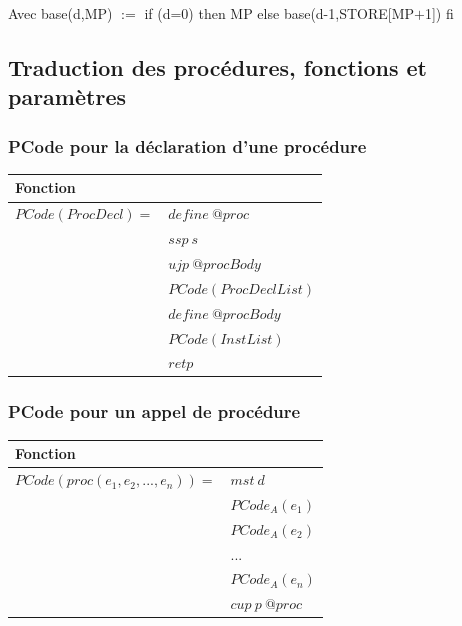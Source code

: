 \documentclass[french,11pt,twoside]{article}
\begin{document}
Avec base(d,MP) $:=$ if (d=0) then MP else base(d-1,STORE[MP$+$1]) fi  

\subsection{Traduction des procédures, fonctions et paramètres}

\subsubsection{PCode pour la déclaration d'une procédure}

\begin{tabular}{| l l |}
\hline
Fonction                                 &                                                                         \\
\hline
$PCode(ProcDecl)=$               & $define\ @proc$                                             \\
                                              & $ssp\  s$ \\
                                              & $ujp\  @procBody$                            \\
                                              & $PCode(ProcDeclList)$                                     \\
                                              & $define\ @procBody$\\
                                              & $PCode(InstList)$\\
                                              & $retp$  \\
\hline
\end{tabular}


\subsubsection{PCode pour un appel de procédure}

\begin{tabular}{| l l |}
\hline
Fonction                                 &                                                                         \\
\hline
$PCode(proc(e_1, e_2, ..., e_n)) =$    & $mst\ d$ \\ 
                                                         & $PCode_A(e_1) $ \\
                                                         & $PCode_A(e_2)$\\
                                                         & $...$\\
                                                         & $PCode_A(e_n)$\\
                                                         & $cup\ p\ @proc$\\
\hline
\end{tabular}
\\
\end{document}

